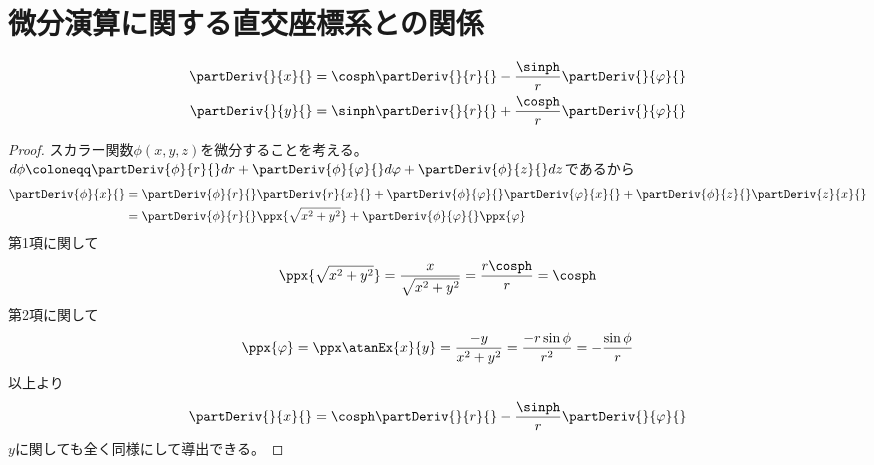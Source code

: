     \section{微分演算に関する直交座標系との関係}
        \begin{shadebox}
            \begin{align*}
                \partDeriv{}{x}{} &= \cosph\partDeriv{}{r}{} - \frac{\sinph}{r}\partDeriv{}{\varphi}{}\\
                \partDeriv{}{y}{} &= \sinph\partDeriv{}{r}{} + \frac{\cosph}{r}\partDeriv{}{\varphi}{}
            \end{align*}
        \end{shadebox}
        \begin{proof}
            \quad\par
            スカラー関数$\phi(x,y,z)$を微分することを考える。
            \def \phr {\partDeriv{\phi}{r}{}}
            \def \php {\partDeriv{\phi}{\varphi}{}}
            \def \phz {\partDeriv{\phi}{z}{}}
            $d\phi \coloneqq \phr dr + \php d\varphi + \phz dz$であるから
            \begin{align*}
                \partDeriv{\phi}{x}{} &= \phr\partDeriv{r}{x}{} + \php\partDeriv{\varphi}{x}{} + \phz\partDeriv{z}{x}{}\\
                &= \phr\ppx{\sqrt{x^2+y^2}} + \php\ppx{\varphi}
            \end{align*}
            第1項に関して
            \[\ppx{\sqrt{x^2+y^2}} = \frac{x}{\sqrt{x^2+y^2}} = \frac{r\cosph}{r} = \cosph\]
            第2項に関して
            \[\ppx{\varphi} = \ppx\atanEx{x}{y} = \frac{-y}{x^2+y^2} = \frac{-r\sin{\phi}}{r^2} = -\frac{\sin{\phi}}{r}\]
            以上より
            \[\partDeriv{}{x}{} = \cosph\partDeriv{}{r}{} - \frac{\sinph}{r}\partDeriv{}{\varphi}{}\]
            $y$に関しても全く同様にして導出できる。
        \end{proof}